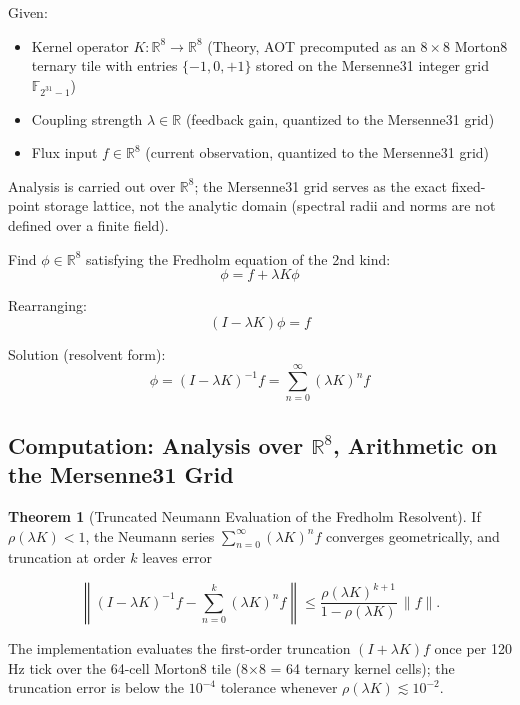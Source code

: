 \documentclass[11pt,oneside]{article}
\theoremstyle{definition}
\newtheorem{theorem}{Theorem}
\begin{document}
Given:
\begin{itemize}
  \item Kernel operator $K: \mathbb{R}^8 \to \mathbb{R}^8$ (Theory, AOT precomputed as an $8 \times 8$ Morton8 ternary tile with entries $\{-1, 0, +1\}$ stored on the Mersenne31 integer grid $\mathbb{F}_{2^{31}-1}$)
  \item Coupling strength $\lambda \in \mathbb{R}$ (feedback gain, quantized to the Mersenne31 grid)
  \item Flux input $f \in \mathbb{R}^8$ (current observation, quantized to the Mersenne31 grid)
\end{itemize}

Analysis is carried out over $\mathbb{R}^8$; the Mersenne31 grid serves as the exact fixed-point storage lattice, not the analytic domain (spectral radii and norms are not defined over a finite field).

Find $\phi \in \mathbb{R}^8$ satisfying the Fredholm equation of the 2nd kind:
\[
\phi = f + \lambda K\phi
\]

Rearranging:
\[
(I - \lambda K) \phi = f
\]

Solution (resolvent form):
\[
\phi = (I - \lambda K)^{-1} f = \sum_{n=0}^{\infty} (\lambda K)^n f
\]

\subsection{Computation: Analysis over $\mathbb{R}^8$, Arithmetic on the Mersenne31 Grid}

\begin{theorem}[Truncated Neumann Evaluation of the Fredholm Resolvent]
If $\rho(\lambda K) < 1$, the Neumann series $\sum_{n=0}^{\infty} (\lambda K)^n f$ converges geometrically, and truncation at order $k$ leaves error

\[
\left\| (I - \lambda K)^{-1} f - \sum_{n=0}^{k} (\lambda K)^n f \right\| \leq \frac{\rho(\lambda K)^{k+1}}{1 - \rho(\lambda K)} \, \|f\|.
\]

The implementation evaluates the first-order truncation $(I + \lambda K)f$ once per 120 Hz tick over the 64-cell Morton8 tile (8\ensuremath{\times}8 = 64 ternary kernel cells); the truncation error is below the $10^{-4}$ tolerance whenever $\rho(\lambda K) \lesssim 10^{-2}$.

\end{theorem}
\end{document}
